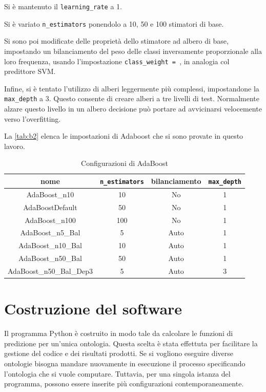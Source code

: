 \documentclass[12pt,a4paper,oneside,hidelinks]{report}
\begin{document}
Si è mantenuto il \texttt{learning\_rate} a 1. 

Si è variato \texttt{n\_estimators} ponendolo a 10, 50 e 100 stimatori di base.

Si sono poi modificate delle proprietà dello stimatore ad albero di base, impostando un bilanciamento del peso delle classi inversamente proporzionale alla loro frequenza, usando l'impostazione \texttt{class\_weight = }, in analogia col predittore SVM.

Infine, si è tentato l'utilizzo di alberi leggermente più complessi, impostandone la \texttt{max\_depth} a 3. Questo consente di creare alberi a tre livelli di test. Normalmente alzare questo livello in un albero decisione può portare ad avvicinarsi velocemente verso l'overfitting.

La \autoref{tab:b2} elenca le impostazioni di Adaboost che si sono provate in questo lavoro.

\begin{table}[ht]%
\centering
\caption{Configurazioni di AdaBoost}\label{tab:b2}
\begin{tabular}{|c|c|c|c|}
\hline
nome & \texttt{n\_estimators} & bilanciamento & \texttt{max\_depth} \\ 
\hline 
AdaBoost\_n10 & 10 & No & 1 \\ 
\hline 
AdaBoostDefault & 50 & No & 1 \\ 
\hline 
AdaBoost\_n100 & 100 & No & 1 \\ 
\hline 
AdaBoost\_n5\_Bal & 5 & Auto & 1 \\ 
\hline 
AdaBoost\_n10\_Bal & 10 & Auto & 1 \\ 
\hline 
AdaBoost\_n50\_Bal & 50 & Auto & 1 \\ 
\hline 
AdaBoost\_n50\_Bal\_Dep3 & 5 & Auto &  3\\ 
\hline 
\end{tabular} 
\end{table}


\section{Costruzione del software}
Il programma Python è costruito in modo tale da calcolare le funzioni di predizione per un'unica ontologia. Questa scelta è stata effettuta per facilitare la gestione del codice e dei risultati prodotti. Se si vogliono eseguire diverse ontologie bisogna mandare nuovamente in esecuzione il processo specificando l'ontologia che si vuole computare.
Tuttavia, per una singola istanza del programma, possono essere inserite più configurazioni contemporaneamente.
\end{document}
